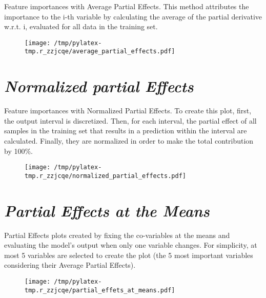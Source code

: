 \documentclass{article}%
\begin{document}
                Feature importances with Average Partial Effects. This method
                attributes the importance to the i-th variable by calculating
                the average of the partial derivative w.r.t. i, evaluated for
                all data in the training set.

                \vfill%


\begin{figure}[H]%
\centering%
\texttt{[image: /tmp/pylatex-tmp.r\_zzjcqe/average\_partial\_effects.pdf]}%
\end{figure}

%
\vfill \pagebreak

%
\section*{\textit{Normalized partial Effects}}%
\label{sec:textitNormalizedpartialEffects}%

                Feature importances with Normalized Partial Effects. 
                To create this plot, first, the output interval is discretized.
                Then, for each interval, the partial effect of all samples
                in the training set that results in a prediction within the
                interval are calculated. Finally, they are normalized in
                order to make the total contribution by 100\%.

                \vfill%


\begin{figure}[H]%
\centering%
\texttt{[image: /tmp/pylatex-tmp.r\_zzjcqe/normalized\_partial\_effects.pdf]}%
\end{figure}

%
\vfill \pagebreak

%
\section*{\textit{Partial Effects at the Means}}%
\label{sec:textitPartialEffectsattheMeans}%

                Partial Effects plots created by fixing the co-variables at
                the means and evaluating the model's output when only one
                variable changes. For simplicity, at most 5 variables are
                selected to create the plot (the 5 most important variables
                considering their Average Partial Effects).

                \vfill%


\begin{figure}[H]%
\centering%
\texttt{[image: /tmp/pylatex-tmp.r\_zzjcqe/partial\_effets\_at\_means.pdf]}%
\end{figure}

%
\vfill \pagebreak

%
\end{document}
